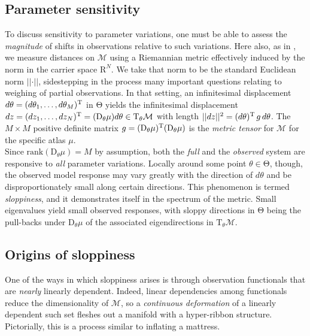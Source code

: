 \documentclass{article}
\newcommand{\D}{\mathrm{D}}
\newcommand{\norm}[1]{\vert\vert#1\vert\vert}
\newcommand{\p}{\theta}
\newcommand{\omr}{\mu}
\newcommand{\omm}{\mathcal{M}}
\newcommand{\R}{\mathrm{R}}
\newcommand{\ps}{\mathrm{\Theta}}
\begin{document}
\subsection{Parameter sensitivity}
%
To discuss sensitivity to parameter variations,
one must be able to assess the \emph{magnitude} of shifts in observations
relative to such variations.
Here also, as in \cite{TMS11}, we measure distances on $\omm$
using a Riemannian metric effectively induced
by the norm in the carrier space $\R^N$.
We take that norm to be the standard Euclidean norm $\norm{\cdot}$,
sidestepping in the process many important questions
relating to weighing of partial observations.
In that setting, an infinitesimal displacement
$d\p = (d\p_1 , \ldots , d\p_M)^{\rm T}$ in $\ps$
yields the infinitesimal displacement
$dz = (dz_1 , \ldots , dz_N)^{\rm T} = (\D_\p\mu) d\p \in \mathrm{T}_\p\omm$
with length $\norm{dz}^2 = (d\p)^{\rm T} \, g \, d\p$.
The $M \times M$ positive definite matrix $g = (\D_\p\omr)^{\rm T}(\D_\p\omr)$
is the \emph{metric tensor} for $\omm$
for the specific atlas $\omr$.\\

Since $\mathrm{rank}(\D_\p \omr) = M$ by assumption,
both the \emph{full} and the \emph{observed} system
are responsive to \emph{all} parameter variations.
Locally around some point $\p \in \ps$, though,
the observed model response may vary greatly with the direction of $d\p$
and be disproportionately small along certain directions.
This phenomenon is termed \emph{sloppiness},
and it demonstrates itself in the spectrum of the metric.
Small eigenvalues yield small observed responses,
with sloppy directions in $\ps$ being the pull-backs under $\D_\p \omr$
of the associated eigendirections in $\mathrm{T}_\p\omm$.

\subsection{Origins of sloppiness}
%
One of the ways in which sloppiness arises
is through observation functionals
that are \emph{nearly} linearly dependent. 
Indeed, linear dependencies among functionals
reduce the dimensionality of $\omm$,
so a \emph{continuous deformation} of a linearly dependent such set
fleshes out a manifold with a hyper-ribbon structure.
Pictorially, this is a process similar to inflating a mattress.\\
\end{document}
